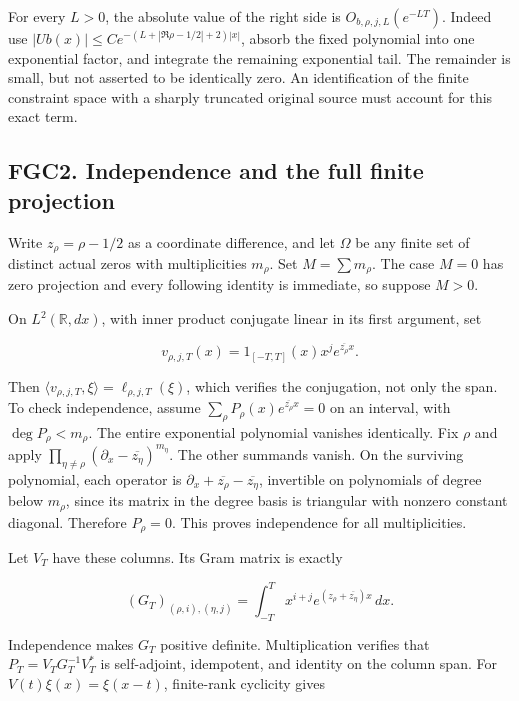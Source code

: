 For every \(L>0\), the absolute value of the right side is
\(O_{b,\rho,j,L}(e^{-LT})\). Indeed use
\(|Ub(x)|\leq C e^{-(L+|\Re\rho-1/2|+2)|x|}\), absorb the fixed
polynomial into one exponential factor, and integrate the remaining
exponential tail. The remainder is small, but not asserted to be
identically zero. An identification of the finite constraint space with
a sharply truncated original source must account for this exact term.

\subsection{FGC2. Independence and the full finite
projection}\label{fgc2.-independence-and-the-full-finite-projection}

Write \(z_\rho=\rho-1/2\) as a coordinate difference, and let \(\Omega\)
be any finite set of distinct actual zeros with multiplicities
\(m_\rho\). Set \(M=\sum m_\rho\). The case \(M=0\) has zero projection
and every following identity is immediate, so suppose \(M>0\).

On \(L^2(\mathbb R,dx)\), with inner product conjugate linear in its
first argument, set

\[
 v_{\rho,j,T}(x)=1_{[-T,T]}(x)x^j e^{\overline{z_\rho}x}.
\]

Then \(\langle v_{\rho,j,T},\xi\rangle=\ell_{\rho,j,T}(\xi)\), which
verifies the conjugation, not only the span. To check independence,
assume \(\sum_\rho P_\rho(x)e^{\overline{z_\rho}x}=0\) on an interval,
with \(\deg P_\rho<m_\rho\). The entire exponential polynomial vanishes
identically. Fix \(\rho\) and apply
\(\prod_{\eta\ne\rho}(\partial_x-\overline{z_\eta})^{m_\eta}\). The
other summands vanish. On the surviving polynomial, each operator is
\(\partial_x+\overline{z_\rho}-\overline{z_\eta}\), invertible on
polynomials of degree below \(m_\rho\), since its matrix in the degree
basis is triangular with nonzero constant diagonal. Therefore
\(P_\rho=0\). This proves independence for all multiplicities.

Let \(V_T\) have these columns. Its Gram matrix is exactly

\[
 (G_T)_{(\rho,i),(\eta,j)}
 =\int_{-T}^T x^{i+j}e^{(z_\rho+\overline{z_\eta})x}\,dx.
\tag{FGC2.1}
\]

Independence makes \(G_T\) positive definite. Multiplication verifies
that \(P_T=V_TG_T^{-1}V_T^*\) is self-adjoint, idempotent, and identity
on the column span. For \(V(t)\xi(x)=\xi(x-t)\), finite-rank cyclicity
gives

